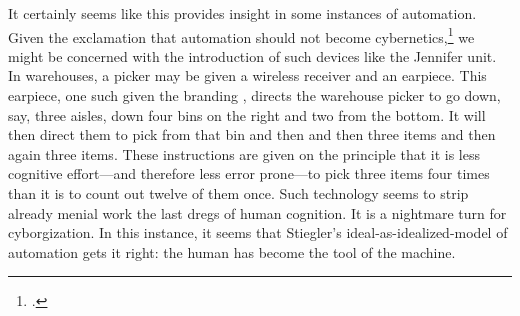 \documentclass[letterpaper,notitlepage,12pt]{article}
\begin{document}
It certainly seems like this provides insight in some instances of automation.
Given the exclamation that automation should not become cybernetics,\footcite[p.
78]{stiegler_technics_1998} we might be concerned with the introduction of such
devices like the Jennifer unit.
In warehouses, a picker may be given a wireless receiver and an earpiece.
This earpiece, one such given the branding , directs the
warehouse picker to go down, say, three aisles, down four bins on the right and
two from the bottom.
It will then direct them to pick from that bin  and then
 and then {three items} and then again {three items}.
These instructions are given on the principle that it is less cognitive
effort---and therefore less error prone---to pick three items four times than it
is to count out twelve of them once.
Such technology seems to strip already menial work the last dregs of human
cognition.
It is a nightmare turn for cyborgization.
In this instance, it seems that Stiegler's ideal-as-idealized-model of
automation gets it right: the human has become the tool of the machine.
\end{document}
